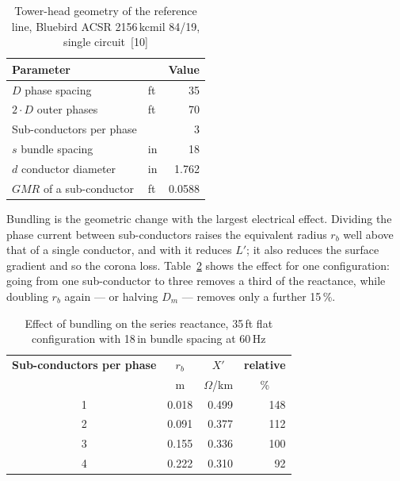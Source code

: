 \begin{table}[!ht]
  \centering
  \begin{tabular}{@{}l l r@{}}
    \toprule
    \textbf{Parameter} & & \multicolumn{1}{c}{\textbf{Value}} \\
    \midrule
    $D$ phase spacing & ft & 35 \\
    $2 \cdot D$ outer phases & ft & 70 \\
    Sub-conductors per phase & & 3 \\
    $s$ bundle spacing & in & 18 \\
    $d$ conductor diameter & in & 1.762 \\
    $GMR$ of a sub-conductor & ft & 0.0588 \\
    \bottomrule
  \end{tabular}
  \caption{Tower-head geometry of the reference line, Bluebird ACSR
           2156\,kcmil 84/19, single circuit~[10]}
  \label{tab:ohl-geometry}
\end{table}

Bundling is the geometric change with the largest electrical effect. Dividing the phase current between sub-conductors raises the
equivalent radius $r_b$ well above that of a single conductor, and with it
reduces $L'$; it also reduces the surface gradient and so the corona loss.
Table~\ref{tab:ohl-bundle} shows the effect for one configuration: going
from one sub-conductor to three removes a third of the reactance, while
doubling $r_b$ again --- or halving $D_m$ --- removes only a further
15\,\%.

\begin{table}[!ht]
  \centering
  \begin{tabular}{@{}c r r r@{}}
    \toprule
    \textbf{Sub-conductors per phase} & \multicolumn{1}{c}{\textbf{$r_b$}}
      & \multicolumn{1}{c}{\textbf{$X'$}}
      & \multicolumn{1}{c}{\textbf{relative}} \\
    & \multicolumn{1}{c}{m} & \multicolumn{1}{c}{$\Omega$/km}
      & \multicolumn{1}{c}{\%} \\
    \midrule
    1 & 0.018 & 0.499 & 148 \\
    2 & 0.091 & 0.377 & 112 \\
    3 & 0.155 & 0.336 & 100 \\
    4 & 0.222 & 0.310 &  92 \\
    \bottomrule
  \end{tabular}
  \caption{Effect of bundling on the series reactance, 35\,ft flat
           configuration with 18\,in bundle spacing at 60\,Hz}
  \label{tab:ohl-bundle}
\end{table}

